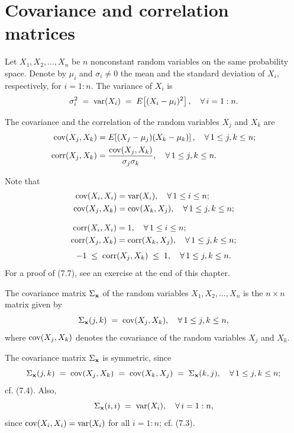 \section{Covariance and correlation matrices}

Let $X_1, X_2, \ldots, X_n$ be $n$ nonconstant random variables on the same probability
space. Denote by $\mu_i$ and $\sigma_i \neq 0$ the mean and the standard deviation of
$X_i$, respectively, for $i = 1:n$. The variance of $X_i$ is
\[
\sigma_i^2 \;=\; \operatorname{var}(X_i) \;=\; E\!\left[(X_i-\mu_i)^2\right], \quad \forall\, i = 1:n.
\]

The covariance and the correlation of the random variables $X_j$ and $X_k$ are
\begin{align}
\operatorname{cov}(X_j,X_k) &= E\!\left[(X_j-\mu_j)(X_k-\mu_k)\right], \quad \forall\, 1\le j,k\le n; \\
\operatorname{corr}(X_j,X_k) &= \frac{\operatorname{cov}(X_j,X_k)}{\sigma_j\sigma_k}, \quad \forall\, 1\le j,k\le n.
\end{align}

Note that
\begin{align}
\operatorname{cov}(X_i,X_i) &= \operatorname{var}(X_i), \quad \forall\, 1\le i\le n; \\
\operatorname{cov}(X_j,X_k) &= \operatorname{cov}(X_k,X_j), \quad \forall\, 1\le j,k\le n;
\end{align}

\begin{align}
\operatorname{corr}(X_i,X_i) &= 1, \quad \forall\, 1\le i\le n; \\
\operatorname{corr}(X_j,X_k) &= \operatorname{corr}(X_k,X_j), \quad \forall\, 1\le j,k\le n;
\end{align}
\begin{equation}
-1 \;\le\; \operatorname{corr}(X_j,X_k) \;\le\; 1, \quad \forall\, 1\le j,k\le n.
\end{equation}
For a proof of (7.7), see an exercise at the end of this chapter.

\begin{definition}
The covariance matrix $\Sigma_{\mathbf{x}}$ of the random variables $X_1, X_2, \ldots, X_n$
is the $n \times n$ matrix given by
\[
\Sigma_{\mathbf{x}}(j,k) \;=\; \operatorname{cov}(X_j,X_k), \quad \forall\, 1\le j,k\le n,
\]
where $\operatorname{cov}(X_j,X_k)$ denotes the covariance of the random variables $X_j$ and $X_k$.
\end{definition}

The covariance matrix $\Sigma_{\mathbf{x}}$ is symmetric, since
\begin{equation}
\Sigma_{\mathbf{x}}(j,k) \;=\; \operatorname{cov}(X_j,X_k) \;=\; \operatorname{cov}(X_k,X_j) \;=\; \Sigma_{\mathbf{x}}(k,j), \quad \forall\, 1\le j,k\le n;
\end{equation}
cf. (7.4). Also,
\begin{equation}
\Sigma_{\mathbf{x}}(i,i) \;=\; \operatorname{var}(X_i), \quad \forall\, i = 1:n,
\end{equation}
since $\operatorname{cov}(X_i,X_i) = \operatorname{var}(X_i)$ for all $i = 1:n$; cf. (7.3).

